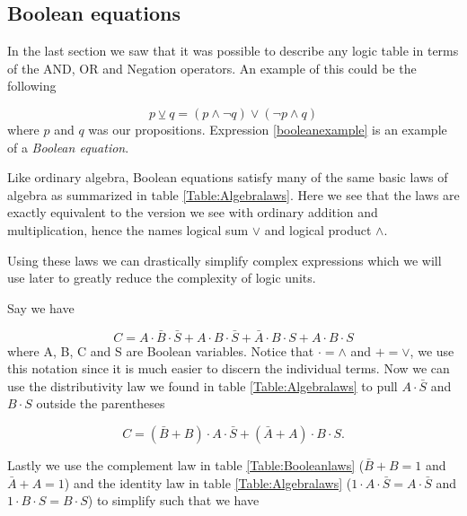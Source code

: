         \subsection{Boolean equations}
            In the last section we saw that it was possible to describe any logic table in terms of the AND, OR and Negation operators. An example of this could be the following
            
            \begin{equation}
                \label{booleanexample}
                p \veebar q = (p \wedge \neg q) \vee (\neg p \wedge q)
            \end{equation}
            where $p$ and $q$ was our propositions. Expression \ref{booleanexample} is an example of a \textit{Boolean equation}. 
            
            Like ordinary algebra, Boolean equations satisfy many of the same basic laws of algebra as summarized in table \ref{Table:Algebralaws}. Here we see that the laws are exactly equivalent to the version we see with ordinary addition and multiplication, hence the names logical sum $\vee$ and logical product $\wedge$.
            
            Using these laws we can drastically simplify complex expressions which we will use later to greatly reduce the complexity of logic units. 
            
            Say we have 
            
            \begin{equation}
               \label{simplify}
                C = A \cdot \bar{B} \cdot \bar{S} + A \cdot B \cdot \bar{S} + \bar{A} \cdot B \cdot S
                  + A \cdot B \cdot S
            \end{equation}
            where A, B, C and S are Boolean variables. Notice that $\cdot = \wedge$ and $+ = \vee$, we use this notation since it is much easier to discern the individual terms. Now we can use the distributivity law we found in table \ref{Table:Algebralaws} to pull $A\cdot \bar{S}$ and $B \cdot S$ outside the parentheses
            
            \begin{equation}
                C = (\bar{B} + B) \cdot A\cdot \bar{S} + (\bar{A} + A)\cdot B\cdot S.
            \end{equation}
            
            Lastly we use the complement law in table \ref{Table:Booleanlaws} ($\bar{B} + B = 1$ and $\bar{A} + A = 1$) and the identity law in table \ref{Table:Algebralaws} ($1 \cdot A\cdot \bar{S} = A\cdot \bar{S}$ and $1 \cdot B\cdot S = B\cdot S$) to simplify such that we have
            
